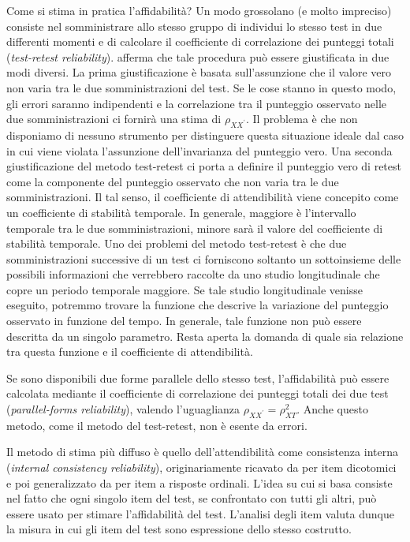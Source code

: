 \documentclass[
  11pt,
]{krantz}
\theoremstyle{definition}
\theoremstyle{definition}
\theoremstyle{definition}
\theoremstyle{definition}
\theoremstyle{remark}
\begin{document}
Come si stima in pratica l'affidabilità? Un modo grossolano (e molto impreciso) consiste nel somministrare allo stesso gruppo di individui lo stesso test in due differenti momenti e di calcolare il coefficiente di correlazione dei punteggi totali (\emph{test-retest reliability}). \citet{mcdonald2013test} afferma che tale procedura può essere giustificata in due modi diversi. La prima giustificazione è basata sull'assunzione che il valore vero non varia tra le due somministrazioni del test. Se le cose stanno in questo modo, gli errori saranno indipendenti e la correlazione tra il punteggio osservato nelle due somministrazioni ci fornirà una stima di \(\rho_{XX^\prime}\). Il problema è che non disponiamo di nessuno strumento per distinguere questa situazione ideale dal caso in cui viene violata l'assunzione dell'invarianza del punteggio vero. Una seconda giustificazione del metodo test-retest ci porta a definire il punteggio vero di retest come la componente del punteggio osservato che non varia tra le due somministrazioni. Il tal senso, il coefficiente di attendibilità viene concepito come un coefficiente di stabilità temporale. In generale, maggiore è l'intervallo temporale tra le due somministrazioni, minore sarà il valore del coefficiente di stabilità temporale. Uno dei problemi del metodo test-retest è che due somministrazioni successive di un test ci forniscono soltanto un sottoinsieme delle possibili informazioni che verrebbero raccolte da uno studio longitudinale che copre un periodo temporale maggiore. Se tale studio longitudinale venisse eseguito, potremmo trovare la funzione che descrive la variazione del punteggio osservato in funzione del tempo. In generale, tale funzione non può essere descritta da un singolo parametro. Resta aperta la domanda di quale sia relazione tra questa funzione e il coefficiente di attendibilità.

Se sono disponibili due forme parallele dello stesso test, l'affidabilità può essere calcolata mediante il coefficiente di correlazione dei punteggi totali dei due test (\emph{parallel-forms reliability}), valendo l'uguaglianza \(\rho_{XX^\prime} = \rho^2_{XT}\). Anche questo metodo, come il metodo del test-retest, non è esente da errori.

Il metodo di stima più diffuso è quello dell'attendibilità come consistenza interna (\emph{internal consistency reliability}), originariamente ricavato da \citet{kuder1937theory} per item dicotomici e poi generalizzato da \citet{cronbach1951coefficient} per item a risposte ordinali. L'idea su cui si basa consiste nel fatto che ogni singolo item del test, se confrontato con tutti gli altri, può essere usato per stimare l'affidabilità del test. L'analisi degli item valuta dunque la misura in cui gli item del test sono espressione dello stesso costrutto.
\end{document}
